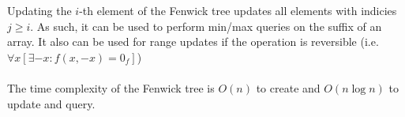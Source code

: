 Updating the $i$-th element of the Fenwick tree updates all elements with indicies $j \geq i$. As such, it can be used to perform min/max queries on the suffix of an array. It also can be used for range updates if the operation is reversible (i.e. $\forall x\left[\exists -x: f(x, -x) = 0_f\right]$)
\\ \\ 
The time complexity of the Fenwick tree is $O(n)$ to create and $O(n \log n)$ to update and query.
\\ \\ 

